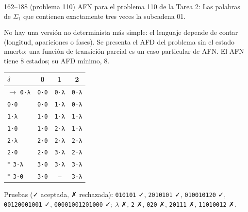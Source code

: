 \documentclass[11pt]{article}
\begin{document}
\begin{ejercicio}{162--188 (problema 110)}{}
AFN para el problema 110 de la Tarea 2: Las palabras de $\Sigma_1$ que contienen exactamente tres veces la subcadena 01.
\end{ejercicio}
\proc No hay una versión no determinista más simple: el lenguaje depende de contar (longitud, apariciones o fases). Se presenta el AFD del problema sin el estado muerto; una función de transición parcial es un caso particular de AFN. El AFN tiene 8 estados; su AFD mínimo, 8.
\begin{center}\small\begin{tabular}{lccc}\toprule
$\delta$ & 0 & 1 & 2 \\\midrule
$\to$ \texttt{0·λ} & \texttt{0·0} & \texttt{0·λ} & \texttt{0·λ} \\
 \texttt{0·0} & \texttt{0·0} & \texttt{1·λ} & \texttt{0·λ} \\
 \texttt{1·λ} & \texttt{1·0} & \texttt{1·λ} & \texttt{1·λ} \\
 \texttt{1·0} & \texttt{1·0} & \texttt{2·λ} & \texttt{1·λ} \\
 \texttt{2·λ} & \texttt{2·0} & \texttt{2·λ} & \texttt{2·λ} \\
 \texttt{2·0} & \texttt{2·0} & \texttt{3·λ} & \texttt{2·λ} \\
$*$ \texttt{3·λ} & \texttt{3·0} & \texttt{3·λ} & \texttt{3·λ} \\
$*$ \texttt{3·0} & \texttt{3·0} & \texttt{--} & \texttt{3·λ} \\
\bottomrule\end{tabular}\end{center}
Pruebas (✓ aceptada, ✗ rechazada): \texttt{010101} ✓, \texttt{2010101} ✓, \texttt{010010120} ✓, \texttt{00120001001} ✓, \texttt{00001001201000} ✓; $\lambda$ ✗, \texttt{2} ✗, \texttt{020} ✗, \texttt{20111} ✗, \texttt{11010012} ✗.
\end{document}
